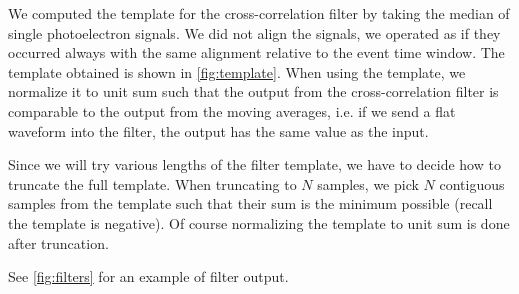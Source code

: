 
We computed the template for the cross-correlation filter by taking the median
of single photoelectron signals. We did not align the signals, we operated as
if they occurred always with the same alignment relative to the event time
window. The template obtained is shown in \autoref{fig:template}. When using
the template, we normalize it to unit sum such that the output from the
cross-correlation filter is comparable to the output from the moving averages,
i.e. if we send a flat waveform into the filter, the output has the same value
as the input.



Since we will try various lengths of the filter template, we have to decide how
to truncate the full template. When truncating to $N$ samples, we pick $N$
contiguous samples from the template such that their sum is the minimum
possible (recall the template is negative). Of course normalizing the template
to unit sum is done after truncation.

\begin{figure}
    

\end{figure}

See \autoref{fig:filters} for an example of filter output.

\begin{figure}
    

\end{figure}

